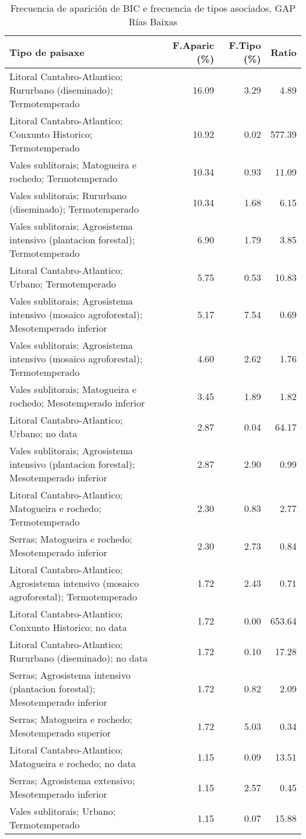 \begin{table}[p]
\centering
\caption{Frecuencia de aparición de BIC e frecuencia de tipos asociados, GAP Rías Baixas} 
\label{vbic12}
\begin{tabular}{lrrr}
  \hline
Tipo de paisaxe & F.Aparic (\%) & F.Tipo (\%) & Ratio \\ 
  \hline
Litoral Cantabro-Atlantico; Rururbano (diseminado); Termotemperado & 16.09 & 3.29 & 4.89 \\ 
  Litoral Cantabro-Atlantico; Conxunto Historico; Termotemperado & 10.92 & 0.02 & 577.39 \\ 
  Vales sublitorais; Matogueira e rochedo; Termotemperado & 10.34 & 0.93 & 11.09 \\ 
  Vales sublitorais; Rururbano (diseminado); Termotemperado & 10.34 & 1.68 & 6.15 \\ 
  Vales sublitorais; Agrosistema intensivo (plantacion forestal); Termotemperado & 6.90 & 1.79 & 3.85 \\ 
  Litoral Cantabro-Atlantico; Urbano; Termotemperado & 5.75 & 0.53 & 10.83 \\ 
  Vales sublitorais; Agrosistema intensivo (mosaico agroforestal); Mesotemperado inferior & 5.17 & 7.54 & 0.69 \\ 
  Vales sublitorais; Agrosistema intensivo (mosaico agroforestal); Termotemperado & 4.60 & 2.62 & 1.76 \\ 
  Vales sublitorais; Matogueira e rochedo; Mesotemperado inferior & 3.45 & 1.89 & 1.82 \\ 
  Litoral Cantabro-Atlantico; Urbano; no data & 2.87 & 0.04 & 64.17 \\ 
  Vales sublitorais; Agrosistema intensivo (plantacion forestal); Mesotemperado inferior & 2.87 & 2.90 & 0.99 \\ 
  Litoral Cantabro-Atlantico; Matogueira e rochedo; Termotemperado & 2.30 & 0.83 & 2.77 \\ 
  Serras; Matogueira e rochedo; Mesotemperado inferior & 2.30 & 2.73 & 0.84 \\ 
  Litoral Cantabro-Atlantico; Agrosistema intensivo (mosaico agroforestal); Termotemperado & 1.72 & 2.43 & 0.71 \\ 
  Litoral Cantabro-Atlantico; Conxunto Historico; no data & 1.72 & 0.00 & 653.64 \\ 
  Litoral Cantabro-Atlantico; Rururbano (diseminado); no data & 1.72 & 0.10 & 17.28 \\ 
  Serras; Agrosistema intensivo (plantacion forestal); Mesotemperado inferior & 1.72 & 0.82 & 2.09 \\ 
  Serras; Matogueira e rochedo; Mesotemperado superior & 1.72 & 5.03 & 0.34 \\ 
  Litoral Cantabro-Atlantico; Matogueira e rochedo; no data & 1.15 & 0.09 & 13.51 \\ 
  Serras; Agrosistema extensivo; Mesotemperado inferior & 1.15 & 2.57 & 0.45 \\ 
  Vales sublitorais; Urbano; Termotemperado & 1.15 & 0.07 & 15.88 \\ 
   \hline
\end{tabular}
\end{table}
